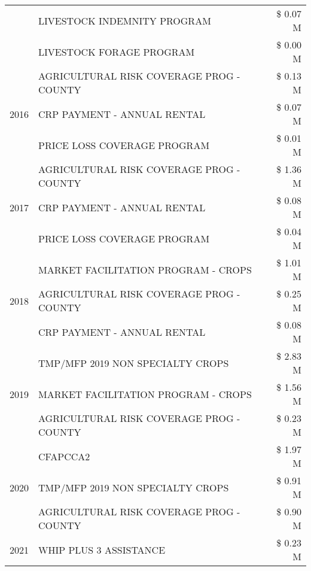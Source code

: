 \begin{tabular}{llr}
 & LIVESTOCK INDEMNITY PROGRAM & \$ 0.07 M \\
 & LIVESTOCK FORAGE PROGRAM & \$ 0.00 M \\
\cline{1-3}
\multirow[t]{3}{*}{2016} & AGRICULTURAL RISK COVERAGE PROG - COUNTY & \$ 0.13 M \\
 & CRP PAYMENT - ANNUAL RENTAL & \$ 0.07 M \\
 & PRICE LOSS COVERAGE PROGRAM & \$ 0.01 M \\
\cline{1-3}
\multirow[t]{3}{*}{2017} & AGRICULTURAL RISK COVERAGE PROG - COUNTY & \$ 1.36 M \\
 & CRP PAYMENT - ANNUAL RENTAL & \$ 0.08 M \\
 & PRICE LOSS COVERAGE PROGRAM & \$ 0.04 M \\
\cline{1-3}
\multirow[t]{3}{*}{2018} & MARKET FACILITATION PROGRAM - CROPS & \$ 1.01 M \\
 & AGRICULTURAL RISK COVERAGE PROG - COUNTY & \$ 0.25 M \\
 & CRP PAYMENT - ANNUAL RENTAL & \$ 0.08 M \\
\cline{1-3}
\multirow[t]{3}{*}{2019} & TMP/MFP 2019 NON SPECIALTY CROPS & \$ 2.83 M \\
 & MARKET FACILITATION PROGRAM - CROPS & \$ 1.56 M \\
 & AGRICULTURAL RISK COVERAGE PROG - COUNTY & \$ 0.23 M \\
\cline{1-3}
\multirow[t]{3}{*}{2020} & CFAPCCA2 & \$ 1.97 M \\
 & TMP/MFP 2019 NON SPECIALTY CROPS & \$ 0.91 M \\
 & AGRICULTURAL RISK COVERAGE PROG - COUNTY & \$ 0.90 M \\
\cline{1-3}
2021 & WHIP PLUS 3 ASSISTANCE & \$ 0.23 M \\
\cline{1-3}
\bottomrule
\end{tabular}

